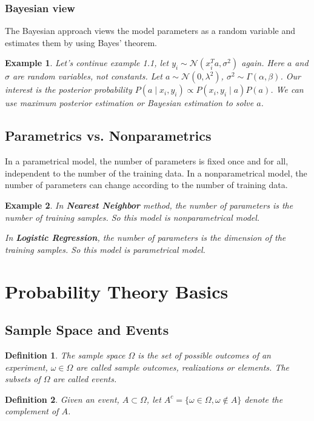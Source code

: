 \documentclass[11pt]{article}
\def\MN{{\mathcal N}}
\newtheorem{definition}{Definition}[section]
\newtheorem{example}{Example}[section]
\begin{document}
\subsubsection{Bayesian view}
The Bayesian approach views the model parameters as a random variable and  estimates them by using Bayes' theorem.

\begin{example}
Let's continue example 1.1, let $y_i \sim \MN(x_i^T a, \sigma^2)$ again. Here $a$ and $\sigma$ are random variables, not constants. Let $a \sim \MN(0, \lambda^2)$, $\sigma^2 \sim \Gamma(\alpha, \beta)$.
Our interest is the posterior probability $P(a\mid x_i, y_i) \propto P(x_i, y_i\mid a)P(a)$. We can use maximum posterior estimation or Bayesian estimation to solve $a$.
\end{example}


\subsection{Parametrics vs. Nonparametrics}
In a parametrical model, the number of parameters is fixed once and for all, independent to the number of the training data.
In a nonparametrical model, the number of parameters can change according to the number of training data.

\begin{example}
In \textbf{Nearest Neighbor} method, the number of parameters is the number of training samples. So this model is nonparametrical model.

In \textbf{Logistic Regression}, the number of parameters is the dimension of the training samples. So this model is parametrical model.
\end{example}
\section{Probability Theory Basics}
\subsection{Sample Space and Events}
\begin{definition}
The \textit{sample space} $\Omega$ is the set of possible outcomes of an experiment,
$\omega \in \Omega$ are called sample outcomes, realizations or elements.
The subsets of $\Omega$ are called \textit{events}.
\end{definition}

\begin{definition}
Given an event, $A\subset \Omega$, let $A^c = \{\omega \in \Omega, \omega \notin A\}$
denote the complement of $A$.
\end{definition}
\end{document}
